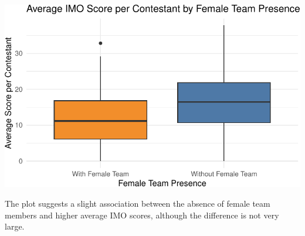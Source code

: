 \documentclass[
  letterpaper,
  DIV=11,
  numbers=noendperiod]{scrartcl}
\begin{document}
\includegraphics{proj_EDA_f24_sbekova_files/figure-pdf/unnamed-chunk-7-1.pdf}

The plot suggests a slight association between the absence of female
team members and higher average IMO scores, although the difference is
not very large.
\end{document}
